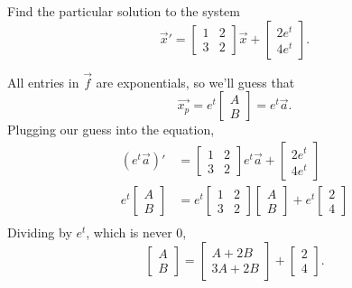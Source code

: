 \begin{example}
	Find the particular solution to the system
	\begin{equation*}
		\vec{x}' = \begin{bmatrix}
			1 & 2 \\
			3 & 2
		\end{bmatrix}\vec{x} + \begin{bmatrix}
			2e^t \\
			4e^t
		\end{bmatrix}.
	\end{equation*}
\end{example}
\noindent
All entries in $\vec{f}$ are exponentials, so we'll guess that
\begin{equation*}
	\vec{x_p} = e^t\begin{bmatrix}
		A \\
		B
	\end{bmatrix} = e^t\vec{a}.
\end{equation*}
Plugging our guess into the equation,
\begin{align*}
	\left(e^t\vec{a}\right)' &= \begin{bmatrix}
		1 & 2 \\
		3 & 2
	\end{bmatrix}e^t\vec{a} + \begin{bmatrix}
		2e^t \\
		4e^t
	\end{bmatrix} \\
	e^t\begin{bmatrix}
		A \\
		B
	\end{bmatrix} &= e^t\begin{bmatrix}
		1 & 2 \\
		3 & 2
	\end{bmatrix}\begin{bmatrix}
		A \\ 
		B
	\end{bmatrix} + e^t\begin{bmatrix}
		2 \\
		4
	\end{bmatrix} \\
\end{align*}
Dividing by $e^t$, which is never 0,
\begin{equation*}
	\begin{bmatrix}
		A \\
		B
	\end{bmatrix} = \begin{bmatrix}
		A + 2B \\
		3A + 2B 
	\end{bmatrix} + \begin{bmatrix}
		2 \\
		4
	\end{bmatrix}.
\end{equation*}
